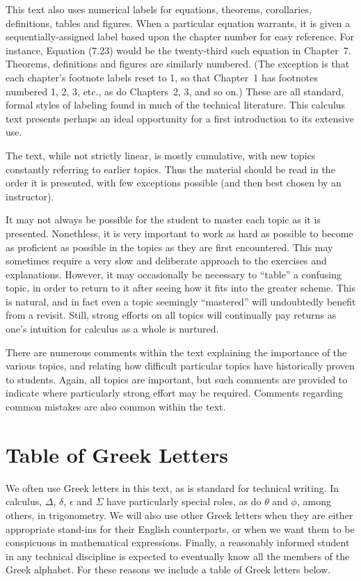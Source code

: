 This text also uses numerical labels for equations, theorems, 
corollaries, definitions,
tables and figures.  When a particular equation warrants, 
it is given  a sequentially-assigned label based
upon the chapter number for easy reference.
For instance, Equation (7.23) would be the twenty-third such equation
in Chapter~7.  Theorems, definitions and figures are 
similarly numbered.  (The exception is that each chapter's
footnote labels reset to 1, so that Chapter~1 has footnotes
numbered 
1, 2, 3, etc., as do Chapters~2, 3, and so on.)
These are all standard,
formal styles of labeling found in much of the technical literature.
This calculus text presents perhaps an ideal opportunity for 
a first introduction to its extensive use.

The text, while not strictly linear, 
is mostly cumulative, with new topics constantly referring to
earlier topics.  Thus the material should be read in the
order it is presented, with few exceptions possible
(and then best chosen by an instructor).

It may not always be possible for the student to master each topic
as it is presented.  Nonethless, 
it is very important to work as hard as possible
to become as proficient as possible in 
the topics as they are first encountered.  This may sometimes
require a very slow and deliberate approach to the exercises
and explanations.  However, 
it may occasionally be necessary to ``table'' a 
confusing topic, in order to return to it after seeing
how it fits into the greater scheme.
This is natural, and in fact even a topic seemingly
``mastered'' will undoubtedly
benefit from a revisit. Still, strong efforts on all
topics will continually pay returns as one's 
intuition for calculus as a whole is nurtured.


There are numerous comments within the text explaining
the importance of the various topics, and relating how
difficult particular topics have historically proven
to students.  Again, all topics are important, but such
comments are provided to indicate where particularly strong effort
may be required.  Comments regarding
common mistakes are also common within the text.



\chapter{Table of Greek Letters}
We often use Greek letters in this text, as is standard for
technical writing.  In calculus, $\Delta$, $\delta$, $\epsilon$ and
$\Sigma$  have particularly special roles, 
as do $\theta$ and $\phi$, among others, in trigonometry.
We will also use other Greek letters when they are either 
appropriate stand-ins for their English counterparts, or when
we want them to be conspicuous  in mathematical
expressions.  Finally, a reasonably informed student
in any technical discipline is expected to eventually know 
all the members of the Greek alphabet.  For these reasons
we include a table of Greek letters below.


